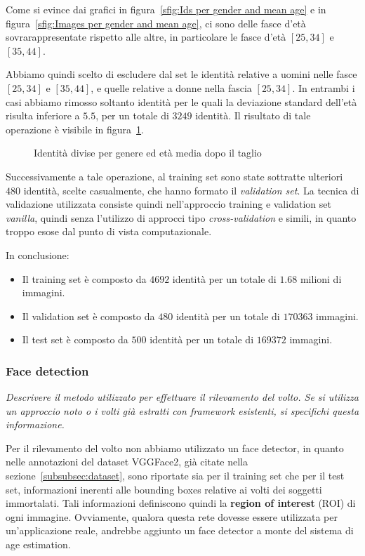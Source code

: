 Come si evince dai grafici in figura~\ref{sfig:Ids per gender and mean age} e in figura~\ref{sfig:Images per gender and mean age}, ci sono delle fasce d'età sovrarappresentate rispetto alle altre, in particolare le fasce d'età $[25,34]$ e $[35,44]$.

Abbiamo quindi scelto di escludere dal set le identità relative a uomini nelle fasce $[25,34]$ e $[35,44]$, e quelle relative a donne nella fascia $[25,34]$. In entrambi i casi abbiamo rimosso soltanto identità per le quali la deviazione standard dell'età risulta inferiore a $5.5$, per un totale di $3249$ identità. Il risultato di tale operazione è visibile in figura~\ref{fig:Ids per gender and mean age after the drop}.

\begin{figure}[ht]
\centering
\def\svgscale{0.7}

\caption{Identità divise per genere ed età media dopo il taglio}
\label{fig:Ids per gender and mean age after the drop}
\end{figure}

Successivamente a tale operazione, al training set sono state sottratte ulteriori $480$ identità, scelte casualmente, che hanno formato il \emph{validation set}. La tecnica di validazione utilizzata consiste quindi nell'approccio training e validation set \emph{vanilla}, quindi senza l'utilizzo di approcci tipo \emph{cross-validation} e simili, in quanto troppo esose dal punto di vista computazionale.

In conclusione:
\begin{itemize}
	\item Il training set è composto da $4692$ identità per un totale di $1.68$ milioni di immagini.
	\item Il validation set è composto da $480$ identità per un totale di $170363$ immagini.
	\item Il test set è composto da $500$ identità per un totale di $169372$ immagini.
\end{itemize}
\subsubsection{Face detection}
\label{subsubsec:face_detection}

\emph{Descrivere il metodo utilizzato per effettuare il rilevamento del volto. Se si utilizza un approccio noto o i volti già estratti con framework esistenti, si specifichi questa informazione.}

Per il rilevamento del volto non abbiamo utilizzato un face detector, in quanto nelle annotazioni del dataset VGGFace2, già citate nella sezione~\ref{subsubsec:dataset}, sono riportate sia per il training set che per il test set, informazioni inerenti alle bounding boxes relative ai volti dei soggetti immortalati. Tali informazioni definiscono quindi la \textbf{region of interest} (ROI) di ogni immagine.
Ovviamente, qualora questa rete dovesse essere utilizzata per un'applicazione reale, andrebbe aggiunto un face detector a monte del sistema di age estimation.

